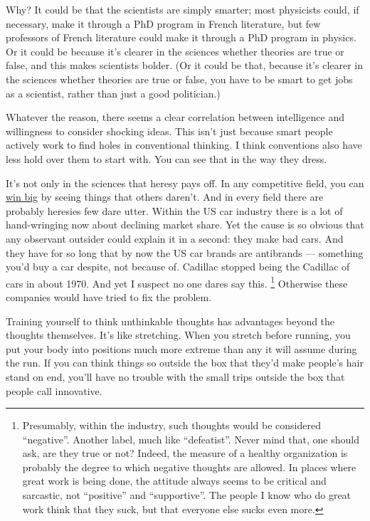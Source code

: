 Why? It could be that the scientists are simply smarter; most physicists
could, if necessary, make it through a PhD program in French literature,
but few professors of French literature could make it through a PhD
program in physics. Or it could be because it's clearer in the sciences
whether theories are true or false, and this makes scientists bolder.
(Or it could be that, because it's clearer in the sciences whether
theories are true or false, you have to be smart to get jobs as a
scientist, rather than just a good politician.)

Whatever the reason, there seems a clear correlation between
intelligence and willingness to consider shocking ideas. This isn't just
because smart people actively work to find holes in conventional
thinking. I think conventions also have less hold over them to start
with. You can see that in the way they dress.

It's not only in the sciences that heresy pays off. In any competitive
field, you can \href{avg.html}{win big} by seeing things that others
daren't. And in every field there are probably heresies few dare utter.
Within the US car industry there is a lot of hand-wringing now about
declining market share. Yet the cause is so obvious that any observant
outsider could explain it in a second: they make bad cars. And they have
for so long that by now the US car brands are antibrands --- something
you'd buy a car despite, not because of. Cadillac stopped being the
Cadillac of cars in about 1970. And yet I suspect no one dares say this.
\footnote{Presumably, within the industry, such thoughts would be
considered ``negative''. Another label, much like ``defeatist''. Never
mind that, one should ask, are they true or not? Indeed, the measure of
a healthy organization is probably the degree to which negative thoughts
are allowed. In places where great work is being done, the attitude
always seems to be critical and sarcastic, not ``positive'' and
``supportive''. The people I know who do great work think that they
suck, but that everyone else sucks even more.} Otherwise these companies would have tried to fix the problem.

Training yourself to think unthinkable thoughts has advantages beyond
the thoughts themselves. It's like stretching. When you stretch before
running, you put your body into positions much more extreme than any it
will assume during the run. If you can think things so outside the box
that they'd make people's hair stand on end, you'll have no trouble with
the small trips outside the box that people call innovative.

